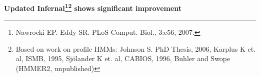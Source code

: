 \documentclass[landscape]{slides}
\begin{document}
\begin{slide}
\begin{center}

\textbf{Updated Infernal\footnote{Nawrocki EP. Eddy SR. PLoS
    Comput. Biol., 3:e56, 2007.}\footnote{Based on work on profile
    HMMs: Johnson S. PhD Thesis, 2006, Karplus K et. al, ISMB, 1995,
    Sj\"olander K et. al, CABIOS, 1996, Buhler and Swope (HMMER2, unpublished)}
 shows significant improvement}
\end{center}
\medskip


\vfill 
\end{slide}

\end{document}
